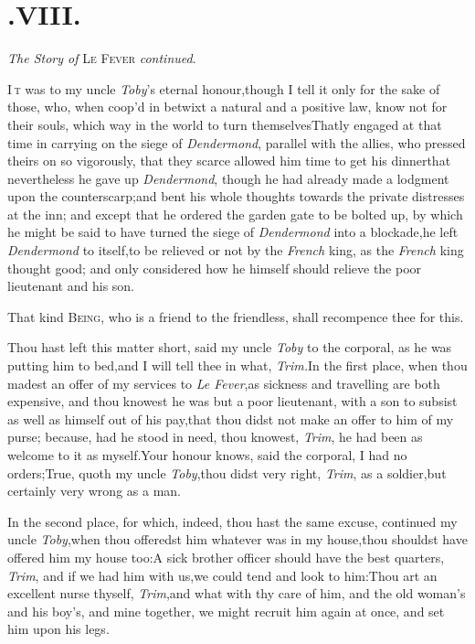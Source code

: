 \documentclass{article}
\begin{document}
\section{.\enspace VIII.}
\centerline{\textit{The Story of} \textsc{Le Fever} \textit{continued}.}

\lettrine{I}{\,t} was to my uncle
\textit{Toby}’s eternal honour,\tsh though I tell it
only for the sake of those, who, when coop’d in betwixt a
natural and a positive law, know not for their souls, which way in
the world to turn themselves\tsk That\break{}\break ly engaged at that time in carrying on
the siege of \textit{Dendermond}, parallel with the allies, who
pressed theirs on so vigorously, that they scarce allowed him time
to get his dinner\tsh that nevertheless he gave up
\textit{Dendermond}, though he had already made a lodgment upon the
counterscarp;\tsh and bent his whole thoughts towards the private
distresses at the inn; and except that he ordered the garden gate
to be bolted up, by which he might be said to have turned the siege
of \textit{Dendermond} into a blockade,\tsk he left
\textit{Dendermond} to itself,\tsk to be relieved or not by the \textit{French} king, as the
\textit{French} king thought good; and only considered how he himself
should relieve the poor lieutenant and his son.\etp{}

\tsh That kind \textsc{Being}, who is a friend to
the friendless, shall recompence thee for this.

Thou hast left this matter short, said my uncle \textit{Toby} to
the corporal, as he was putting him to bed,\tsh and I will
tell thee in what, \textit{Trim.}\tsh In the first place,
when thou madest an offer of my services to \textit{Le
Fever},\tsh as sickness and travelling are both
expensive, and thou knowest he was but a poor lieutenant, with a
son to subsist as well as himself out of his pay,\tsk that thou
didst not make an offer to him of my purse; because, had he stood
in need, thou knowest, \textit{Trim}, he had been as welcome to it as
myself.\tsh Your honour knows, said the corporal, I had no
orders;\tsh True, quoth my uncle \textit{Toby},\tsk thou
didst very right, \textit{Trim}, as a soldier,\tsk but certainly
very wrong as a man.

In the second place, for which, indeed, thou hast the same
excuse, continued my uncle \textit{Toby},\tsh when thou
offeredst him whatever was in my house,\tsk thou shouldst
have offered him my house too:\break\tsh A sick brother officer
should have the best quarters, \textit{Trim}, and if we had him with
us,\tsk we could tend and look to him:\tsh Thou art an
excellent nurse thyself, \textit{Trim},\tsk and what with thy care
of him, and the old woman’s and his boy’s, and mine
together, we might recruit him again at once, and set him upon his
legs.\tsh
\end{document}

